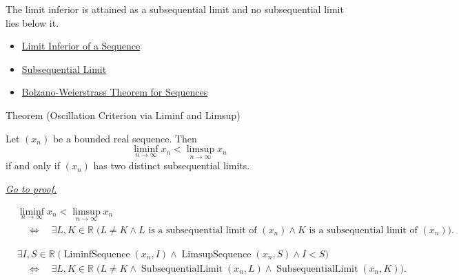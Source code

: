 \begin{remark*}[Interpretation]
The limit inferior is attained as a subsequential limit and no subsequential
limit lies below it.
\end{remark*}

\begin{remark*}[Dependencies]\hfill
\begin{itemize}
  \item \hyperref[def:liminf-sequence]{Limit Inferior of a Sequence}
  \item \hyperref[def:subsequential-limit]{Subsequential Limit}
  \item \hyperref[thm:bolzano-weierstrass-sequences]{Bolzano-Weierstrass Theorem for Sequences}
\end{itemize}
\end{remark*}


\begin{theorembox}{Theorem (Oscillation Criterion via Liminf and Limsup)}
\begin{theorem}
\label{thm:oscillation-criterion-via-liminf-limsup}
Let $(x_n)$ be a bounded real sequence. Then
\[
  \liminf_{n\to\infty}x_n
  <
  \limsup_{n\to\infty}x_n
\]
if and only if $(x_n)$ has two distinct subsequential limits.

\smallskip
\noindent
\hyperref[prf:oscillation-criterion-via-liminf-limsup]{\textit{Go to proof.}}
\end{theorem}
\end{theorembox}

\begin{remark*}
\[
\begin{aligned}
&\liminf_{n\to\infty}x_n<\limsup_{n\to\infty}x_n\\
&\quad\Longleftrightarrow\quad
\exists L,K\in\mathbb{R}\;
\bigl(
  L\ne K
  \land L\text{ is a subsequential limit of }(x_n)
  \land K\text{ is a subsequential limit of }(x_n)
\bigr).
\end{aligned}
\]
\end{remark*}

\begin{remark*}
\[
\begin{aligned}
&\exists I,S\in\mathbb{R}\;
\bigl(
  \operatorname{LiminfSequence}(x_n,I)
  \land
  \operatorname{LimsupSequence}(x_n,S)
  \land I<S
\bigr)\\
&\quad\Longleftrightarrow\quad
\exists L,K\in\mathbb{R}\;
\bigl(
  L\ne K
  \land \operatorname{SubsequentialLimit}(x_n,L)
  \land \operatorname{SubsequentialLimit}(x_n,K)
\bigr).
\end{aligned}
\]
\end{remark*}

